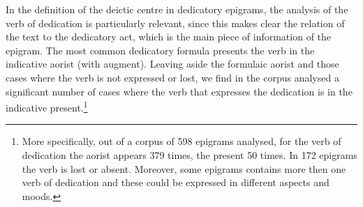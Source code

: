 \documentclass[amsthm,ebook]{saparticle}
\begin{document}
In the definition of the deictic centre in dedicatory epigrams, the analysis of the verb of dedication is particularly
relevant, since this makes clear the relation of the text to the dedicatory act, which is the main piece of information
of the epigram. The most common dedicatory formula presents the verb in the indicative aorist (with augment). Leaving
aside the formulaic aorist and those cases where the verb is not expressed or lost, we find in the corpus analysed a
significant number of cases where the verb that expresses the dedication is in the indicative present.\footnote{ More
specifically, out of a corpus of 598 epigrams analysed, for the verb of dedication the aorist appears 379 times, the
present 50 times. In 172 epigrams the verb is lost or absent. Moreover, some epigrams contains more then one verb of
dedication and these could be expressed in different aspects and moods. } 
\end{document}
